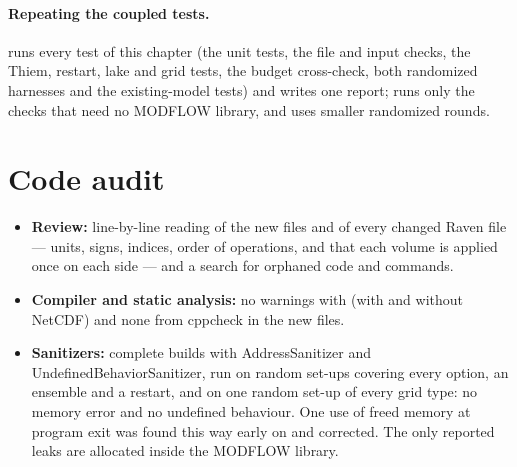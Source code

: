 \paragraph{Repeating the coupled tests.}  runs every test of this chapter (the unit tests, the
file and input checks, the Thiem, restart, lake and grid tests, the budget cross-check, both randomized harnesses and the
existing-model tests) and writes one report;  runs only the checks that need no MODFLOW library, and
 uses smaller randomized rounds.

\section{Code audit}\label{sec:codeaudit}\label{sec:sanitizer}
\begin{itemize}
\item \textbf{Review:} line-by-line reading of the new files and of every changed Raven file --- units, signs, indices, order
of operations, and that each volume is applied once on each side --- and a search for orphaned code and commands.
\item \textbf{Compiler and static analysis:} no warnings with  (with and without NetCDF) and none
from cppcheck in the new files.
\item \textbf{Sanitizers:} complete builds with AddressSanitizer and UndefinedBehaviorSanitizer, run on random set-ups covering
every option, an ensemble and a restart, and on one random set-up of every grid type: no memory error and no undefined
behaviour. One use of freed memory at program exit
was found this way early on and corrected. The only reported leaks are allocated inside the MODFLOW library.
\end{itemize}


